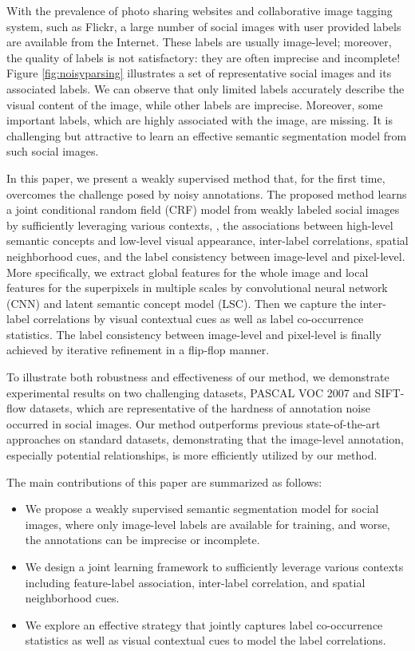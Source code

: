 With the prevalence of photo sharing websites and collaborative image tagging system, such as Flickr, a large number of social images with user provided labels are available from the Internet.
These labels are usually image-level; moreover, the quality of labels is not satisfactory: they are often imprecise and incomplete!
Figure \ref{fig:noisyparsing} illustrates a set of representative social images and its associated labels.
We can observe that only limited labels accurately describe the visual content of the image, while other labels are imprecise.
Moreover, some important labels, which are highly associated with the image, are missing.
It is challenging but attractive to learn an effective semantic segmentation model from such social images.

In this paper, we present a weakly supervised method that, for the first time, overcomes the challenge posed by noisy annotations.
The proposed method learns a joint conditional random field (CRF) model from weakly labeled social images by sufficiently leveraging various contexts, \eg, the associations between high-level semantic concepts and low-level visual appearance, inter-label correlations, spatial neighborhood cues, and the label consistency between image-level and pixel-level.
More specifically, we extract global features for the whole image and local features for the superpixels in multiple scales by convolutional neural network (CNN) and latent semantic concept model (LSC).
Then we capture the inter-label correlations by visual contextual cues as well as label co-occurrence statistics.
The label consistency between image-level and pixel-level is finally achieved by iterative refinement in a flip-flop manner.

To illustrate both robustness and effectiveness of our method, we demonstrate experimental results on two challenging datasets, PASCAL VOC 2007 and SIFT-flow datasets, which are representative of the hardness of annotation noise occurred in social images.
Our method outperforms previous state-of-the-art approaches on standard datasets, demonstrating that the image-level annotation, especially potential relationships, is more efficiently utilized by our method. 

The main contributions of this paper are summarized as follows:
\begin{itemize}
  \item We propose a weakly supervised semantic segmentation model for social images, where only image-level labels are available for training, and worse, the annotations can be imprecise or incomplete. 
  \item We design a joint learning framework to sufficiently leverage various contexts including feature-label association, inter-label correlation, and spatial neighborhood cues.
  \item We explore an effective strategy that jointly captures label co-occurrence statistics as well as visual contextual cues to model the label correlations.
\end{itemize}
